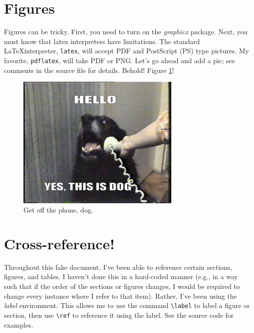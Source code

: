 \documentclass[12pt, letterpaper]{article}
\newcommand{\bslash}[0]{\textbackslash}
\begin{document}
\section{Figures}

Figures can be tricky.  First, you need to turn on the \emph{graphicx} package.
Next, you must know that latex interpreters have limitations.  The standard 
\LaTeX interpreter, {\tt latex}, will accept PDF and PostScript (PS) type 
pictures.  My favorite, {\tt pdflatex}, will take PDF or PNG.  Let's go ahead 
and add a pic; see comments in the source file for details.  Behold!  
Figure \ref{fig:dog}!

\begin{figure}[!b] %
\begin{center}
  \includegraphics[width=8cm]{dogphone.png} 
  \caption{Get off the phone, dog.}
  \label{fig:dog}
\end{center}
\end{figure}

\section{Cross-reference!}
\label{sec:cross}

Throughout this fake document, I've been able to reference certain sections, 
figures, and tables.  I haven't done this in a hard-coded manner (e.g., in a 
way such that if the order of the sections or figures changes, I would be 
required to change every instance where I refer to that item).  Rather, I've 
been using the \emph{label} environment.  This allows me to use the command 
{\tt \bslash label} to label a figure or section, then use {\tt \bslash ref} to
reference it using the label.  See the source code for examples.
\end{document}
